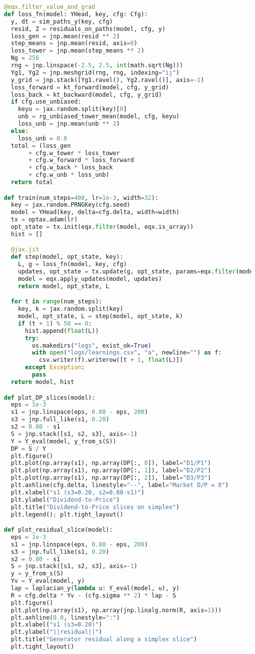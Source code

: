 ﻿\documentclass[11pt,letterpaper,oneside]{article}
\numberwithin{equation}{section}
\newcommand{\1}{\mathbf{1}}
\begin{document}
\begin{lstlisting}[language=Python,basicstyle=\ttfamily\small]
@eqx.filter_value_and_grad
def loss_fn(model: YHead, key, cfg: Cfg):
  y, dt = sim_paths_y(key, cfg)
  resid, Z = residuals_on_paths(model, cfg, y)
  loss_gen = jnp.mean(resid ** 2)
  step_means = jnp.mean(resid, axis=0)
  loss_tower = jnp.mean(step_means ** 2)
  Ng = 256
  rng = jnp.linspace(-2.5, 2.5, int(math.sqrt(Ng)))
  Yg1, Yg2 = jnp.meshgrid(rng, rng, indexing="ij")
  y_grid = jnp.stack([Yg1.ravel(), Yg2.ravel()], axis=-1)
  loss_forward = kt_forward(model, cfg, y_grid)
  loss_back = kt_backward(model, cfg, y_grid)
  if cfg.use_unbiased:
    keyu = jax.random.split(key)[0]
    unb = rg_unbiased_tower_mean(model, cfg, keyu)
    loss_unb = jnp.mean(unb ** 2)
  else:
    loss_unb = 0.0
  total = (loss_gen
       + cfg.w_tower * loss_tower
       + cfg.w_forward * loss_forward
       + cfg.w_back * loss_back
       + cfg.w_unb * loss_unb)
  return total

def train(num_steps=400, lr=1e-3, width=32):
  key = jax.random.PRNGKey(cfg.seed)
  model = YHead(key, delta=cfg.delta, width=width)
  tx = optax.adam(lr)
  opt_state = tx.init(eqx.filter(model, eqx.is_array))
  hist = []

  @jax.jit
  def step(model, opt_state, key):
    L, g = loss_fn(model, key, cfg)
    updates, opt_state = tx.update(g, opt_state, params=eqx.filter(model, eqx.is_array))
    model = eqx.apply_updates(model, updates)
    return model, opt_state, L

  for t in range(num_steps):
    key, k = jax.random.split(key)
    model, opt_state, L = step(model, opt_state, k)
    if (t + 1) % 50 == 0:
      hist.append(float(L))
      try:
        os.makedirs("logs", exist_ok=True)
        with open("logs/learnings.csv", "a", newline="") as f:
          csv.writer(f).writerow([t + 1, float(L)])
      except Exception:
        pass
  return model, hist

def plot_DP_slices(model):
  eps = 1e-3
  s1 = jnp.linspace(eps, 0.80 - eps, 200)
  s3 = jnp.full_like(s1, 0.20)
  s2 = 0.80 - s1
  S = jnp.stack([s1, s2, s3], axis=-1)
  Y = Y_eval(model, y_from_s(S))
  DP = S / Y
  plt.figure()
  plt.plot(np.array(s1), np.array(DP[:, 0]), label="D1/P1")
  plt.plot(np.array(s1), np.array(DP[:, 1]), label="D2/P2")
  plt.plot(np.array(s1), np.array(DP[:, 2]), label="D3/P3")
  plt.axhline(cfg.delta, linestyle="--", label="Market D/P = δ")
  plt.xlabel("s1 (s3=0.20, s2=0.80-s1)")
  plt.ylabel("Dividend-to-Price")
  plt.title("Dividend-to-Price slices on simplex")
  plt.legend(); plt.tight_layout()

def plot_residual_slice(model):
  eps = 1e-3
  s1 = jnp.linspace(eps, 0.80 - eps, 200)
  s3 = jnp.full_like(s1, 0.20)
  s2 = 0.80 - s1
  S = jnp.stack([s1, s2, s3], axis=-1)
  y = y_from_s(S)
  Yv = Y_eval(model, y)
  lap = laplacian_y(lambda u: Y_eval(model, u), y)
  R = cfg.delta * Yv - (cfg.sigma ** 2) * lap - S
  plt.figure()
  plt.plot(np.array(s1), np.array(jnp.linalg.norm(R, axis=1)))
  plt.axhline(0.0, linestyle=":")
  plt.xlabel("s1 (s3=0.20)")
  plt.ylabel("||residual||")
  plt.title("Generator residual along a simplex slice")
  plt.tight_layout()


\end{lstlisting}
\end{document}
